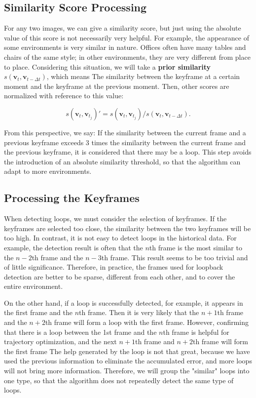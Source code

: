 \subsection{Similarity Score Processing}
For any two images, we can give a similarity score, but just using the absolute value of this score is not necessarily very helpful. For example, the appearance of some environments is very similar in nature. Offices often have many tables and chairs of the same style; in other environments, they are very different from place to place. Considering this situation, we will take a \textbf{prior similarity} $s\left( \mathbf{v}_t, \mathbf{v}_{t-\Delta t}\right)$, which means The similarity between the keyframe at a certain moment and the keyframe at the previous moment. Then, other scores are normalized with reference to this value:

\begin{equation}
	s\left( \mathbf{v}_t, \mathbf{v}_{t_j}\right)' = s\left( \mathbf{v}_t, \mathbf{v}_{t_j}\right) / s\left( \mathbf{v}_t, \mathbf{v}_{t-\Delta t}\right).
\end{equation}

From this perspective, we say: If the similarity between the current frame and a previous keyframe exceeds 3 times the similarity between the current frame and the previous keyframe, it is considered that there may be a loop. This step avoids the introduction of an absolute similarity threshold, so that the algorithm can adapt to more environments.

\subsection{Processing the Keyframes}
When detecting loops, we must consider the selection of keyframes. If the keyframes are selected too close, the similarity between the two keyframes will be too high. In contrast, it is not easy to detect loops in the historical data. For example, the detection result is often that the $n$th frame is the most similar to the $n-2$th frame and the $n-3$th frame. This result seems to be too trivial and of little significance. Therefore, in practice, the frames used for loopback detection are better to be sparse, different from each other, and to cover the entire environment.

On the other hand, if a loop is successfully detected, for example, it appears in the first frame and the $n$th frame. Then it is very likely that the $n+1$th frame and the $n+2$th frame will form a loop with the first frame. However, confirming that there is a loop between the 1st frame and the $n$th frame is helpful for trajectory optimization, and the next $n+1$th frame and $n+2$th frame will form the first frame The help generated by the loop is not that great, because we have used the previous information to eliminate the accumulated error, and more loops will not bring more information. Therefore, we will group the "similar" loops into one type, so that the algorithm does not repeatedly detect the same type of loops.

